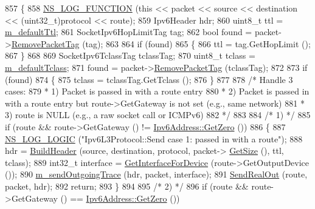 \begin{DoxyCode}
857 \{
858   \hyperlink{log-macros-disabled_8h_a90b90d5bad1f39cb1b64923ea94c0761}{NS\_LOG\_FUNCTION} (\textcolor{keyword}{this} << packet << source << destination << (uint32\_t)protocol << route);
859   Ipv6Header hdr;
860   uint8\_t ttl = \hyperlink{classns3_1_1Ipv6L3Protocol_a2857858d48a3ce4f6bc1912d721825b7}{m\_defaultTtl};
861   SocketIpv6HopLimitTag tag;
862   \textcolor{keywordtype}{bool} found = packet->\hyperlink{classns3_1_1Packet_a078fe922d976a417ab25ba2f3c2fd667}{RemovePacketTag} (tag);
863 
864   \textcolor{keywordflow}{if} (found)
865     \{
866       ttl = tag.GetHopLimit ();
867     \}
868 
869   SocketIpv6TclassTag tclassTag;
870   uint8\_t tclass = \hyperlink{classns3_1_1Ipv6L3Protocol_a0ead80eb6fa685c54dc155dff9157345}{m\_defaultTclass};
871   found = packet->\hyperlink{classns3_1_1Packet_a078fe922d976a417ab25ba2f3c2fd667}{RemovePacketTag} (tclassTag);
872   
873   \textcolor{keywordflow}{if} (found)
874     \{
875       tclass = tclassTag.GetTclass ();
876     \}
877 
878   \textcolor{comment}{/* Handle 3 cases:}
879 \textcolor{comment}{   * 1) Packet is passed in with a route entry}
880 \textcolor{comment}{   * 2) Packet is passed in with a route entry but route->GetGateway is not set (e.g., same network)}
881 \textcolor{comment}{   * 3) route is NULL (e.g., a raw socket call or ICMPv6)}
882 \textcolor{comment}{   */}
883 
884   \textcolor{comment}{/* 1) */}
885   \textcolor{keywordflow}{if} (route && route->GetGateway () != \hyperlink{classns3_1_1Ipv6Address_a63a34bdb1505e05fbdd07d316d0bd7e6}{Ipv6Address::GetZero} ())
886     \{
887       \hyperlink{group__logging_ga88acd260151caf2db9c0fc84997f45ce}{NS\_LOG\_LOGIC} (\textcolor{stringliteral}{"Ipv6L3Protocol::Send case 1: passed in with a route"});
888       hdr = \hyperlink{classns3_1_1Ipv6L3Protocol_a5374a6687ad09cfcd48ef13a99b48d16}{BuildHeader} (source, destination, protocol, packet->
      \hyperlink{classns3_1_1Packet_a462855c9929954d4301a4edfe55f4f1c}{GetSize} (), ttl, tclass);
889       int32\_t \textcolor{keyword}{interface }= \hyperlink{classns3_1_1Ipv6L3Protocol_a878292513d6294e2dfdeccbe1ed1d996}{GetInterfaceForDevice} (route->GetOutputDevice ());
890       \hyperlink{classns3_1_1Ipv6L3Protocol_aac1ff242aa91275202e37cf7d805eec8}{m\_sendOutgoingTrace} (hdr, packet, interface);
891       \hyperlink{classns3_1_1Ipv6L3Protocol_adad363af4c50cd94505b918b15f228d4}{SendRealOut} (route, packet, hdr);
892       \textcolor{keywordflow}{return};
893     \}
894 
895   \textcolor{comment}{/* 2) */}
896   \textcolor{keywordflow}{if} (route && route->GetGateway () == \hyperlink{classns3_1_1Ipv6Address_a63a34bdb1505e05fbdd07d316d0bd7e6}{Ipv6Address::GetZero} ())

\end{DoxyCode}
